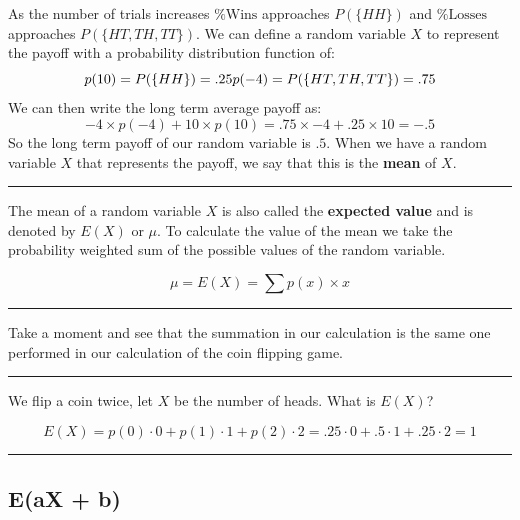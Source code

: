 \documentclass[
]{book}
\theoremstyle{definition}
\theoremstyle{definition}
\theoremstyle{definition}
\theoremstyle{remark}
\let\BeginKnitrBlock\begin \let\EndKnitrBlock\end
\begin{document}
As the number of trials increases \(\% \text{Wins}\) approaches \(P(\{HH\})\) and \(\% \text{Losses}\) approaches \(P(\{HT,TH,TT\})\). We can define a random variable \(X\) to represent the payoff with a probability distribution function of:
\[p(10) = P(\{HH\}) = .25 \\ p(-4) = P(\{HT,TH,TT\})=.75\]
We can then write the long term average payoff as:
\[{-4} \times p({-4})+10 \times p(10) = .75 \times {-4} + .25 \times 10=-.5\]
So the long term payoff of our random variable is \(.5\). When we have a random variable \(X\) that represents the payoff, we say that this is the \textbf{mean} of \(X\).

\begin{center}\rule{0.5\linewidth}{0.5pt}\end{center}

\BeginKnitrBlock{definition}[Expected Value]
\protect\hypertarget{def:expectedvalue}{}{\label{def:expectedvalue} {} }The mean of a random variable \(X\) is also called the \textbf{expected value} and is denoted by \(E(X)\) or \(\mu\). To calculate the value of the mean we take the probability weighted sum of the possible values of the random variable.

\[ \mu = E(X) = \sum p(x) \times x\]
\EndKnitrBlock{definition}

\begin{center}\rule{0.5\linewidth}{0.5pt}\end{center}

Take a moment and see that the summation in our calculation is the same one performed in our calculation of the coin flipping game.

\begin{center}\rule{0.5\linewidth}{0.5pt}\end{center}

\BeginKnitrBlock{example}[Average Heads]
\protect\hypertarget{exm:unnamed-chunk-13}{}{\label{exm:unnamed-chunk-13} {} }We flip a coin twice, let \(X\) be the number of heads. What is \(E(X)\)?

\[E(X) = p(0) \cdot 0 + p(1) \cdot 1 + p(2) \cdot 2 = .25 \cdot 0 + .5 \cdot 1 + .25 \cdot 2 = 1\]
\EndKnitrBlock{example}

\begin{center}\rule{0.5\linewidth}{0.5pt}\end{center}

\hypertarget{eax-b}{%
\subsection{E(aX + b)}\label{eax-b}}
\end{document}
